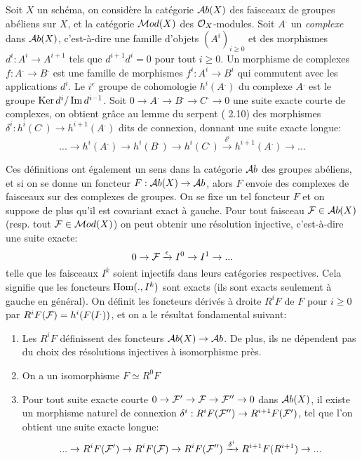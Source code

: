 Soit $X$ un schéma, on considère la catégorie $\mathcal{A} b(X)$ des faisceaux de groupes abéliens sur $X$, et la catégorie $\mathcal{M} od(X)$ des $\mathcal{O}_X$-modules. Soit $A^.$ un \textit{complexe} dans $\mathcal{A} b(X)$, c'est-à-dire une famille d'objets $(A^i)_{i\geq 0}$ et des morphismes $d^i:A^i\rightarrow A^{i+1}$ tels que $d^{i+1}d^i=0$ pour tout $i\geq 0$. Un morphisme de complexes $f:A^.\rightarrow B^.$ est une famille de morphismes $f^i:A^i\rightarrow B^i$ qui commutent avec les applications $d^i$. Le $i^e$ groupe de cohomologie $h^i(A^.)$ du complexe $A^.$ est le groupe $\operatorname{Ker} d^i/\operatorname{Im} d^{i-1}$. Soit $0\rightarrow A^.\rightarrow B^. \rightarrow C^. \rightarrow 0$ une suite exacte courte de complexes, on obtient grâce au lemme du serpent (\cite{atiyahmacdo} 2.10) des morphismes $\delta ^i:h^i(C^.)\rightarrow h^{i+1}(A^.) $ dits de connexion, donnant une suite exacte longue:
\begin{equation}\label{eq:longSES}
...\rightarrow h^i(A^.) \rightarrow h^i(B^.) \rightarrow h^i(C^.) \xrightarrow{\delta ^i} h^{i+1}(A^.) \rightarrow ...
\end{equation}

Ces définitions ont également un sens dans la catégorie $\mathcal{A} b$ des groupes abéliens, et si on se donne un foncteur $F:\mathcal{A} b(X)\rightarrow \mathcal{A} b$, alors $F$ envoie des complexes de faisceaux sur des complexes de groupes. On se fixe un tel foncteur $F$ et on suppose de plus qu'il est covariant exact à gauche. Pour tout faisceau $\mathcal{F}\in \mathcal{A} b(X)$ (resp. tout $\mathcal{F}\in\mathcal{M} od(X)$) on peut obtenir une résolution injective, c'est-à-dire une suite exacte:
$$0\rightarrow \mathcal{F} \xrightarrow{\epsilon} I^0\rightarrow I^1\rightarrow ...$$
telle que les faisceaux $I^k$ soient injectifs dans leurs catégories respectives. Cela signifie que les foncteurs $\operatorname{Hom}(.,I^k)$ sont exacts (ils sont exacts seulement à gauche en général). On définit les foncteurs dérivés à droite $R^iF$ de $F$ pour $i\geq 0$ par $R^i F(\mathcal{F})=h^i(F(I^.))$, et on a le résultat fondamental suivant:

\begin{thm}
\begin{enumerate}
\item Les $R^i F$ définissent des foncteurs $\mathcal{A} b(X)\rightarrow \mathcal{A} b$. De plus, ils ne dépendent pas du choix des résolutions injectives à isomorphisme près.
\item On a un isomorphisme $F\simeq R^0F$
\item Pour tout suite exacte courte $0\rightarrow \mathcal{F}'\rightarrow \mathcal{F} \rightarrow \mathcal{F}'' \rightarrow 0$ dans $\mathcal{A} b(X)$, il existe un morphisme naturel de connexion $\delta^i:R^iF(\mathcal{F}'')\rightarrow R^{i+1}F(\mathcal{F}')$, tel que l'on obtient une suite exacte longue:
$$...\rightarrow R^iF(\mathcal{F}') \rightarrow R^iF(\mathcal{F}) \rightarrow R^iF(\mathcal{F}'') \xrightarrow{\delta ^i} R^{i+1}F(R^{i+1}) \rightarrow ...$$
\end{enumerate}
\end{thm}

